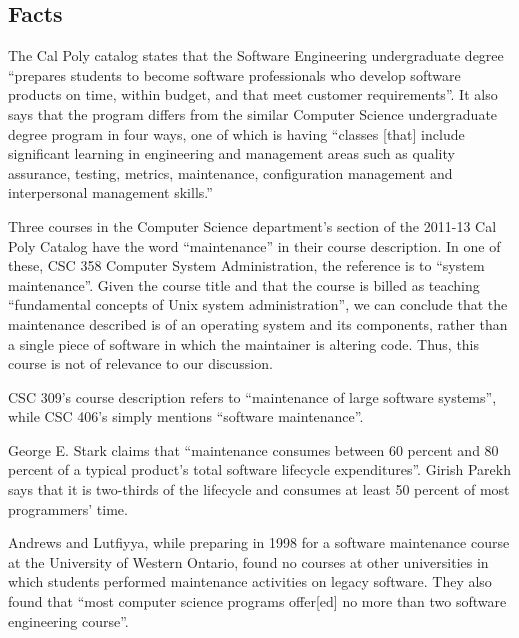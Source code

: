 \documentclass[11pt]{article}
\begin{document}
\begin{multicols}{2}
\setcounter{page}{1}
\section{Facts}

The Cal Poly catalog states that the Software Engineering undergraduate degree ``prepares students to become software professionals who develop software 
products on time, within budget, and that meet customer requirements''. \cite{catalogDept}  It also says that the program differs from the similar Computer Science undergraduate degree program in four ways, one of which is having ``classes [that] include significant learning in engineering and management areas such as quality assurance, testing, metrics, maintenance, configuration management and interpersonal management skills.'' \cite{catalogDept}

Three courses in the Computer Science department's section of the 2011-13 Cal Poly Catalog have the word ``maintenance'' in their course description. \cite{catalogCourses}  In one of these, CSC 358 Computer System Administration, the reference is to ``system maintenance''. \cite{catalogCourses}  Given the course title and that the course is billed as teaching ``fundamental concepts of Unix system administration'', \cite{catalogCourses} we can conclude that the maintenance described is of an operating system and its components, rather than a single piece of software in which the maintainer is altering code.  Thus, this course is not of relevance to our discussion.

CSC 309's course description refers to ``maintenance of large software systems'', while CSC 406's simply mentions ``software maintenance''. \cite{catalogCourses}

George E. Stark claims that ``maintenance consumes between 60 percent and 80 percent of a typical product's total software lifecycle expenditures''. \cite{stark97}  Girish Parekh says that it is two-thirds of the lifecycle and consumes at least 50 percent of most programmers' time. \cite{parekh}

Andrews and Lutfiyya, while preparing in 1998 for a software maintenance course at the University of Western Ontario, found no courses at other universities in which students performed maintenance activities on legacy software. \cite{andrews} They also found that ``most computer science programs offer[ed] no more than two software engineering course''. \cite{andrews}


\end{multicols}
\end{document}
